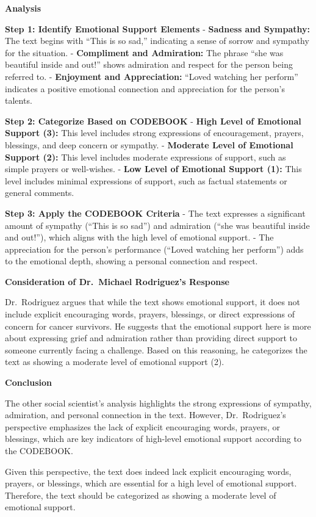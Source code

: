 \textbf{Analysis}

\textbf{Step 1: Identify Emotional Support Elements} - \textbf{Sadness
and Sympathy:} The text begins with ``This is so sad,'' indicating a
sense of sorrow and sympathy for the situation. - \textbf{Compliment and
Admiration:} The phrase ``she was beautiful inside and out!'' shows
admiration and respect for the person being referred to. -
\textbf{Enjoyment and Appreciation:} ``Loved watching her perform''
indicates a positive emotional connection and appreciation for the
person's talents.

\textbf{Step 2: Categorize Based on CODEBOOK} - \textbf{High Level of
Emotional Support (3):} This level includes strong expressions of
encouragement, prayers, blessings, and deep concern or sympathy. -
\textbf{Moderate Level of Emotional Support (2):} This level includes
moderate expressions of support, such as simple prayers or well-wishes.
- \textbf{Low Level of Emotional Support (1):} This level includes
minimal expressions of support, such as factual statements or general
comments.

\textbf{Step 3: Apply the CODEBOOK Criteria} - The text expresses a
significant amount of sympathy (``This is so sad'') and admiration
(``she was beautiful inside and out!''), which aligns with the high
level of emotional support. - The appreciation for the person's
performance (``Loved watching her perform'') adds to the emotional
depth, showing a personal connection and respect.

\textbf{Consideration of Dr.~Michael Rodriguez's
Response}

Dr.~Rodriguez argues that while the text shows emotional support, it
does not include explicit encouraging words, prayers, blessings, or
direct expressions of concern for cancer survivors. He suggests that the
emotional support here is more about expressing grief and admiration
rather than providing direct support to someone currently facing a
challenge. Based on this reasoning, he categorizes the text as showing a
moderate level of emotional support (2).

\textbf{Conclusion}

The other social scientist's analysis highlights the strong expressions
of sympathy, admiration, and personal connection in the text. However,
Dr.~Rodriguez's perspective emphasizes the lack of explicit encouraging
words, prayers, or blessings, which are key indicators of high-level
emotional support according to the CODEBOOK.

Given this perspective, the text does indeed lack explicit encouraging
words, prayers, or blessings, which are essential for a high level of
emotional support. Therefore, the text should be categorized as showing
a moderate level of emotional support.

